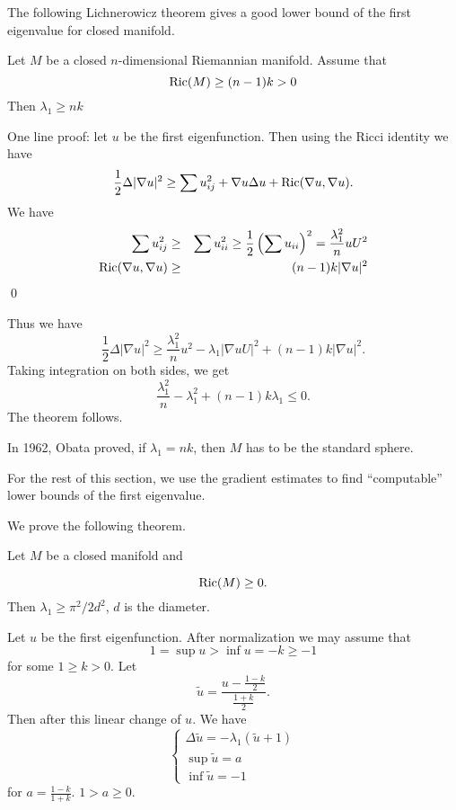 The following Lichnerowicz theorem gives a good lower bound of the first eigenvalue for closed manifold.

\begin{theorem}[Lichnerowicz] Let $ M$ be a closed $n$-dimensional Riemannian manifold. Assume that 
%
\[ {\rm Ric} (M) \geq (n-1) k > 0 \]
%
Then $ \lambda _1 \geq n k $
\end{theorem}

One line proof: let $ u$ be the first eigenfunction. Then using the Ricci identity we have 
%
\[ \frac{1}{2} \Delta |\nabla u|^2 \geq \sum u _{ij} ^2 + \nabla u \Delta u + {\rm Ric}(\nabla u, \nabla u). \]
%
We have 
%
\begin{eqnarray*} \sum u^2_{ij} &\geq & \sum u^2 _{ii} \geq \frac{1}{2} \left(\sum u_{ii} \right) ^2  
= \frac{\lambda_1^2}{n} uU^2 \\
{\rm Ric} (\nabla u, \nabla u) & \geq & (n-1) k |\nabla u |^2 
\end{eqnarray*}
\qed

Thus we have 
%
\[\frac{1}{2} \Delta |\nabla u|^2 \geq  \frac{\lambda ^2_1}{n} u^2 - \lambda _1 |\nabla uU |^2 +  (n-1)k | \nabla u|^2 .\]
%
Taking integration on both sides, we get 
%
\[  \frac{\lambda ^2_1}{n} - \lambda ^2_1 + (n-1) k \lambda _1 \leq 0 .\]
%
The theorem follows.

In 1962, Obata proved, if $ \lambda _1 = nk $, then $ M$ has to be the standard sphere. 

For the rest of this section, we use the gradient estimates to find ``computable'' lower bounds of the first eigenvalue.

We prove the following theorem.

\begin{theorem}[Li-Yau] Let $M$ be a closed manifold and 
\end{theorem}
\[ {\rm Ric} (M)\geq 0.\]
%
Then $ \lambda _ 1 \geq \pi ^2 / 2 d ^2 $, $d$ is the diameter.

Let  $ u$ be the first eigenfunction. After normalization we may assume that 
%
\[ 1 = \sup u > \inf u = - k \geq -1\]
for some $ 1 \geq k > 0 $. Let 
%
\[ \tilde{u} = \frac{u - \frac{1-k}{2}}{\frac{1+k}{2}}.\]
Then after this linear change of $u$. We have 
%
\[ \left\{ \begin{array}{l} \Delta \tilde{u} = - \lambda _1 ( \tilde{u} + 1 )\\
\sup \tilde{u} = a \\
\inf \tilde{u} = - 1 
\end{array}\right.\]
% 
for $ a = \frac{1-k}{1+k} $.  $ 1 > a \geq 0 $.

